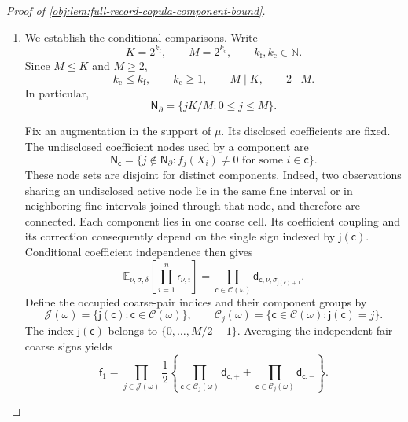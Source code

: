 \documentclass[11pt]{article}
\begin{document}
\begin{proof}[Proof of \cref{obj:lem:full-record-copula-component-bound}]
\begin{enumerate}
Let the disclosure law be the pushforward of independent fair coefficient pairs:
\[
\mu_{\partial}
 =
 4^{-(K+1)}
 \sum_{\boldsymbol\lambda,\boldsymbol\eta\in\{-1,1\}^{K+1}}
 \operatorname{Dirac}_{\mathsf D(\boldsymbol\lambda,\boldsymbol\eta)},
\qquad
\mu
 =\lambda^{\otimes n}
   \otimes\operatorname{Bernoulli}(\varepsilon)^{\otimes n}
   \otimes\mu_{\partial}.
\]
It is a probability law with the required covariate and flag marginals, and
\[
\delta_j\ne\bot\ \Longleftrightarrow\ j\in\mathsf N_{\partial}
\qquad\text{for }\mu\text{-almost every }\omega.
\]
The kernels are measurable: the graph is determined by finitely many measurable cell assignments, and all coefficient and label averages are finite. Their normalization gives
\[
(\mu\otimes P_\nu)\circ\operatorname{pr}_{\mathrm{aug}}^{-1}
 =\mu,\qquad \nu\in\{0,1\},
\qquad
(\mu\otimes Q)(\mathsf\Omega_{\mathrm{aug}}\times\mathsf Z_n)=1.
\]

\item\label{proof:full-record-copula-component-bound:conditional-comparisons}
We establish the conditional comparisons. Write
\[
K=2^{k_{\mathrm f}},\qquad M=2^{k_{\mathrm c}},
\qquad k_{\mathrm f},k_{\mathrm c}\in\mathbb N.
\]
Since \(M\le K\) and \(M\ge2\),
\[
k_{\mathrm c}\le k_{\mathrm f},
\qquad k_{\mathrm c}\ge1,
\qquad M\mid K,\qquad 2\mid M.
\]
In particular,
\[
\mathsf N_{\partial}
 =\{jK/M:0\le j\le M\}.
\]

Fix an augmentation in the support of \(\mu\). Its disclosed coefficients are fixed. The undisclosed coefficient nodes used by a component are
\[
\mathsf N_{\mathsf c}
 =
 \{j\notin\mathsf N_{\partial}:
       f_j(X_i)\ne0\text{ for some }i\in\mathsf c\}.
\]
These node sets are disjoint for distinct components. Indeed, two observations sharing an undisclosed active node lie in the same fine interval or in neighboring fine intervals joined through that node, and therefore are connected. Each component lies in one coarse cell. Its coefficient coupling and its correction consequently depend on the single sign indexed by \(\mathsf j(\mathsf c)\). Conditional coefficient independence then gives
\[
\mathbb E_{\nu,\sigma,\delta}
 \left[\prod_{i=1}^n\mathsf r_{\nu,i}\right]
 =
 \prod_{\mathsf c\in\mathscr C(\omega)}
 \mathsf d_{\mathsf c,\nu,\sigma_{\mathsf j(\mathsf c)+1}}.
\]
Define the occupied coarse-pair indices and their component groups by
\[
\mathscr J(\omega)
 =\{\mathsf j(\mathsf c):\mathsf c\in\mathscr C(\omega)\},
\qquad
\mathscr C_j(\omega)
 =\{\mathsf c\in\mathscr C(\omega):\mathsf j(\mathsf c)=j\}.
\]
The index \(\mathsf j(\mathsf c)\) belongs to \(\{0,\ldots,M/2-1\}\). Averaging the independent fair coarse signs yields
\[
\mathsf f_1
 =
 \prod_{j\in\mathscr J(\omega)}
 \frac12\left\{
   \prod_{\mathsf c\in\mathscr C_j(\omega)}
      \mathsf d_{\mathsf c,+}
   +
   \prod_{\mathsf c\in\mathscr C_j(\omega)}
      \mathsf d_{\mathsf c,-}
 \right\}.
\]


\end{enumerate}
\end{proof}
\end{document}
